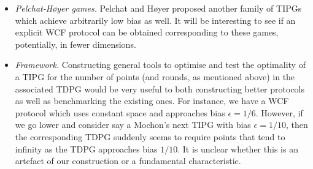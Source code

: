 \documentclass{theoretics}
\begin{document}
\begin{itemize}
  \item \emph{Pelchat-Høyer games.}  Pelchat and  Høyer \cite{pelchat13} proposed another family of TIPGs which achieve arbitrarily low bias as well. It will be interesting to see if an explicit WCF protocol can be obtained corresponding to these games, potentially, in fewer dimensions.
  \item \emph{Framework.} Constructing general tools to optimise and test the
        optimality of a TIPG for the number of points (and rounds, as mentioned above)
        in the associated TDPG would be very useful to both constructing better
        protocols as well as benchmarking the existing ones. For instance, we have a WCF protocol which uses constant space and approaches bias $\epsilon=1/6$. However, if we go lower and consider say a Mochon's next TIPG with bias $\epsilon=1/10$, then the corresponding TDPG suddenly seems to require points that tend to infinity as the TDPG approaches bias $1/10$. It is unclear whether this is an artefact of our construction or a fundamental characteristic.
\end{itemize}
\end{document}
